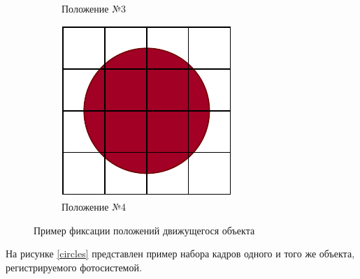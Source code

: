 \begin{figure}[h!]
\begin{subfigure}{0.17\textwidth}
        \caption{Положение №3}
    \end{subfigure}
    \begin{subfigure}{0.17\textwidth}
        \centering
        \includegraphics[width=\textwidth]{assets/c4.pdf}
        \caption{Положение №4}
    \end{subfigure}
    \caption{Пример фиксации положений движущегося объекта}
    \label{shoots}
\end{figure}

На рисунке \ref{circles} представлен пример набора кадров одного и того же объекта, регистрируемого фотосистемой.

